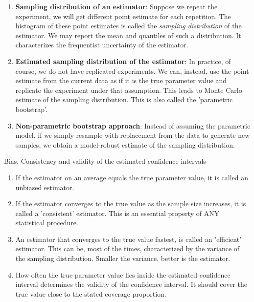 \documentclass[10pt]{beamer}
\begin{document}
\begin{frame}
\begin{enumerate}
\item \textbf {Sampling distribution of an estimator}: Suppose we repeat the experiment, we will get different point estimate for each repetition. The histogram of these point estimates is called the \emph {sampling distribution} of the estimator. We may report the mean and quantiles of such a distribution. It characterizes the \alert {frequentist} uncertainty of the estimator. 
\item \textbf {Estimated sampling distribution of the estimator}: In practice, of course, we do not have replicated experiments. We can, instead, use the point estimate from the current data as if it is the true parameter value and replicate the experiment under that assumption. This leads to Monte Carlo estimate of the sampling distribution. This is also called the 'parametric bootstrap'. 
\item \textbf {Non-parametric bootstrap approach}: Instead of assuming the parametric model, if we simply resample with replacement from the data to generate new samples, we obtain a model-robust estimate of the sampling distribution. 
\end{enumerate}
\end{frame}

\begin{frame}
\begin{center}
\large Bias, Consistency and validity of the estimated confidence intervals
\end{center}
\begin{enumerate}
\item If the estimator on an average equals the true parameter value, it is called an unbiased estimator. 
\pause
\item If the estimator converges to the true value as the sample size increases, it is called a 'consistent' estimator. This is an essential property of ANY statistical procedure. 
\pause
\item An estimator that converges to the true value fastest, is called an 'efficient' estimator. This can be, most of the times, characterized by the variance of the sampling distribution. Smaller the variance, better is the estimator. 
\pause
\item How often the true parameter value lies inside the \alert {estimated} confidence interval determines the validity of the confidence interval. It should cover the true value close to the stated coverage proportion. 
\end{enumerate}
\end{frame}
\end{document}

